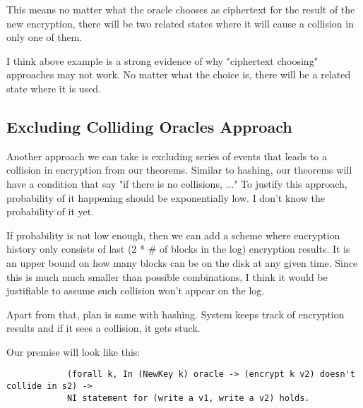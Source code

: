 \documentclass[onecolumn]{paper}
\begin{document}
		This means no matter what the oracle chooses as ciphertext for the result of the new encryption, there will be two related states where it will cause a collision in only one of them.
		
		I think above example is a strong evidence of why "ciphertext choosing" approaches may not work.
		No matter what the choice is, there will be a related state where it is used.
		
		\subsection{Excluding Colliding Oracles Approach}
		Another approach we can take is excluding series of events that leads to a collision in encryption from our theorems. Similar to hashing, our theorems will have a condition that say "if there is no collisions, ..." To justify this approach, probability of it happening should be exponentially low.
		{\color{red} I don't know the probability of it yet.} 
		
		If probability is not low enough, then we can add a scheme where encryption history only consists of last (2 * \# of blocks in the log) encryption results. It is an upper bound on how many blocks can be on the disk at any given time. Since this is much much smaller than possible combinations, I think it would be justifiable to assume such collision won't appear on the log.
		
		Apart from that, plan is same with hashing. System keeps track of encryption results and if it sees a collision, it gets stuck.
	
		Our premise will look like this:
		\begin{verbatim}
			(forall k, In (NewKey k) oracle -> (encrypt k v2) doesn't collide in s2) ->
			NI statement for (write a v1, write a v2) holds.
		\end{verbatim} 
\end{document}

